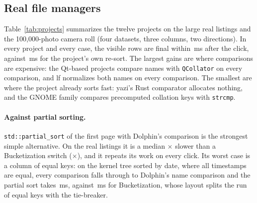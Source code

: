 \documentclass[11pt]{article}
\theoremstyle{definition}
\begin{document}
\begin{table}[t]
\centering
\caption{Synthetic workload, $n=10^6$, milliseconds. Pre-sort registers all
four keys and assigns every element; it is paid once per load. Speed-up is
\texttt{std::sort} over switch $+$ first page.}
\label{tab:synthetic}
\resizebox{\linewidth}{!}{}
\end{table}

\subsection{Real file managers}

Table~\ref{tab:projects} summarizes the twelve projects on the large real
listings and the 100{,}000-photo camera roll (four datasets, three columns, two
directions). In every project and every case, the visible rows are final within
\,ms after the click, against
\,ms for the project's own re-sort. The largest gains
are where comparisons are expensive: the Qt-based projects compare names with
\texttt{QCollator} on every comparison, and lf normalizes both names on every
comparison. The smallest are where the project already sorts fast: yazi's Rust
comparator allocates nothing, and the GNOME family compares precomputed
collation keys with \texttt{strcmp}.

\begin{table}[t]
\centering
\caption{Column clicks on the large listings (36{,}069--100{,}000 entries), Xeon
reference machine, milliseconds; ranges over datasets, columns and directions.
\emph{First click slower} counts cases where pre-sort $+$ switch exceeded the
project's re-sort. \emph{Valid orders} counts every dataset, column and
direction, including the small folders; for Dolphin it includes the cases where
Dolphin's own comparator has cycles and no exact order exists
(Section~\ref{sec:defects}).}
\label{tab:projects}
\resizebox{\linewidth}{!}{}
\end{table}

\paragraph{Against partial sorting.} \texttt{std::partial\_sort} of the first
page with Dolphin's comparison is the strongest simple alternative. On the real
listings it is a median $\times$ slower than a
Bucketization switch ($\times$), and it repeats its work
on every click. Its worst case is a column of equal keys: on the kernel tree
sorted by date, where all timestamps are equal, every comparison falls through
to Dolphin's name comparison and the partial sort takes
\,ms, against
\,ms for Bucketization, whose layout
splits the run of equal keys with the tie-breaker.
\end{document}
